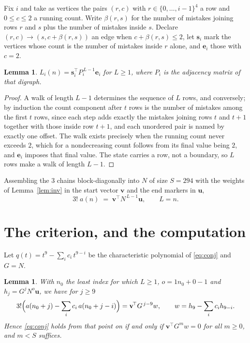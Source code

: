 \documentclass[11pt,a4paper]{article}
\theoremstyle{plain}
\newtheorem{lemma}[theorem]{Lemma}
\theoremstyle{definition}
\begin{document}
Fix $i$ and take as vertices the pairs $(r,c)$ with $r\in\{0,\dots,i-1\}^{4}$ a row
and $0\le c\le2$ a running count. Write $\beta(r,s)$ for the number of mistakes joining
rows $r$ and $s$ plus the number of mistakes inside $s$. Declare $(r,c)\to(s,c+\beta(r,s))$
an edge when $c+\beta(r,s)\le2$, let $\mathbf{s}_i$ mark the vertices whose count is the
number of mistakes inside $r$ alone, and $\mathbf{e}_i$ those with $c=2$.

\begin{lemma}\label{lem:walk}
$L_i(n)=\mathbf{s}_i^{\!\top}P_i^{\,L-1}\mathbf{e}_i$ for $L\ge1$, where $P_i$ is the
adjacency matrix of that digraph.
\end{lemma}

\begin{proof}
A walk of length $L-1$ determines the sequence of $L$ rows, and conversely; by induction
the count component after $t$ rows is the number of mistakes among the first $t$ rows,
since each step adds exactly the mistakes joining rows $t$ and $t+1$ together with those
inside row $t+1$, and each unordered pair is named by exactly one offset. The walk exists
precisely when the running count never exceeds $2$, which for a nondecreasing count follows
from its final value being $2$, and $\mathbf{e}_i$ imposes that final value. The state
carries a row, not a boundary, so $L$ rows make a walk of length $L-1$.
\end{proof}

Assembling the $3$ chains block-diagonally into $N$ of size $S=294$ with the weights of
Lemma~\ref{lem:inv} in the start vector $\mathbf{v}$ and the end markers in
$\mathbf{u}$,
\begin{equation}\label{eq:walk2}
3!\;a(n)\;=\;\mathbf{v}^{\!\top}N^{\,L-1}\mathbf{u},\qquad L=n .
\end{equation}

\section{The criterion, and the computation}

Let $q(t)=t^{9}-\sum_i c_i\,t^{9-i}$ be the characteristic polynomial of
\eqref{eq:conj} and $G=N$.

\begin{lemma}\label{lem:crit}
With $n_0$ the least index for which $L\ge1$, $o=1n_0+0-1$ and
$h_j=G^{j}N^{o}\mathbf{u}$, we have for $j\ge9$
\[
3!\Bigl(a(n_0+j)-\sum_i c_i\,a(n_0+j-i)\Bigr)=\mathbf{v}^{\!\top}G^{\,j-9}w,
\qquad w=h_{9}-\sum_i c_ih_{9-i} .
\]
Hence \eqref{eq:conj} holds from that point on if and only if
$\mathbf{v}^{\!\top}G^{m}w=0$ for all $m\ge0$, and $m<S$ suffices.
\end{lemma}
\end{document}
